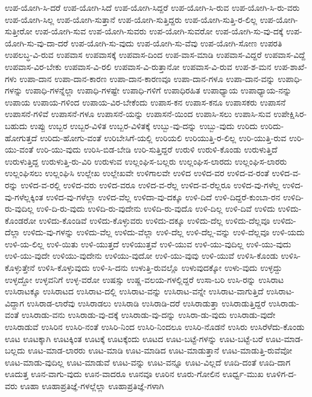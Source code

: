 {ಉಪ-ಯೋಗಿ-ಸಿ-ದರೆ
ಉಪ-ಯೋಗಿ-ಸಿದೆ
ಉಪ-ಯೋಗಿ-ಸಿದ್ದರೆ
ಉಪ-ಯೋಗಿ-ಸಿ-ರುವ
ಉಪ-ಯೋಗಿ-ಸಿ-ರು-ವರು
ಉಪ-ಯೋಗಿ-ಸಿಲ್ಲ
ಉಪ-ಯೋಗಿ-ಸುತ್ತಾನೆ
ಉಪ-ಯೋಗಿ-ಸುತ್ತಿದ್ದರು
ಉಪ-ಯೋಗಿ-ಸುತ್ತಿ-ರ-ಲಿಲ್ಲ
ಉಪ-ಯೋಗಿ-ಸುತ್ತೀರೋ
ಉಪ-ಯೋಗಿ-ಸುವ
ಉಪ-ಯೋಗಿ-ಸುವರು
ಉಪ-ಯೋಗಿ-ಸುವರೋ
ಉಪ-ಯೋಗಿ-ಸು-ವು-ದಕ್ಕೆ
ಉಪ-ಯೋಗಿ-ಸು-ವು-ದಾ-ದರೆ
ಉಪ-ಯೋಗಿ-ಸು-ವುದು
ಉಪ-ಯೋಗಿ-ಸು-ವೆವು
ಉಪ-ಯೋಗಿ-ಸೋಣ
ಉಪರತಿ
ಉಪಲಬ್ಧ-ವಿ-ರುವ
ಉಪವಾಸ
ಉಪವಾಸಕ್ಕೆ
ಉಪವಾಸ-ದಿಂದ
ಉಪ-ವಾಸ-ಮಾಡಿ
ಉಪವಾಸ-ವಿದ್ದರೆ
ಉಪವಾಸ-ವಿದ್ದೆ
ಉಪವಾಸ-ವಿರ-ಬೇಕು
ಉಪವಾಸ-ವಿ-ರಲಿ
ಉಪವಾಸ-ವಿ-ರುತ್ತಾನೋ
ಉಪವಾಸ-ವಿ-ರುವ
ಉಪ-ಶ-ಮನ
ಉಪ-ಶಾಖೆ-ಗಳು
ಉಪಾ-ದಾನ
ಉಪಾ-ದಾನ-ಕಾರಣ
ಉಪಾ-ದಾನ-ಕಾರಣವೂ
ಉಪಾ-ದಾನ-ಗಳೂ
ಉಪಾ-ದಾನ-ವನ್ನು
ಉಪಾಧಿ-ಗಳನ್ನು
ಉಪಾಧಿ-ಗಳನ್ನೆಲ್ಲಾ
ಉಪಾಧಿ-ಗಳಷ್ಟೇ
ಉಪಾಧಿ-ಗಳಿಗೆ
ಉಪಾಧಿರಹಿತ
ಉಪಾಧ್ಯಾಯ
ಉಪಾಧ್ಯಾಯ-ನನ್ನು
ಉಪಾಯ
ಉಪಾಯ-ಗಳಿಂದ
ಉಪಾಯ-ವಿರ-ಬೇಕೆಂದು
ಉಪಾಸ-ಕನ
ಉಪಾಸ-ಕನೂ
ಉಪಾಸಕರು
ಉಪಾಸನೆ
ಉಪಾಸನೆ-ಗಳಿವೆ
ಉಪಾಸನೆ-ಗಳೂ
ಉಪಾಸನೆ-ಯನ್ನು
ಉಪಾಸನೆ-ಯಿಂದ
ಉಪಾಸಿ-ಸಲು
ಉಪಾಸಿ-ಸುವ
ಉಪೇಕ್ಷಿಸಿರ-ಬಹುದು
ಉಪ್ಪು
ಉಬ್ಬರ
ಉಬ್ಬರ-ವಿಳಿತ
ಉಬ್ಬರ-ವಿಳಿತಕ್ಕೆ
ಉಬ್ಬು-ವು-ದನ್ನು
ಉಬ್ಬು-ವುದು
ಉರಿದು
ಉರಿದು-ಹೋಗುತ್ತದೆ
ಉರಿದು-ಹೋಗು-ವಂತೆ
ಉರಿಬೇಸಿಗೆ-ಯಲ್ಲಿ
ಉರಿಯಲಿ
ಉರಿಯುತ್ತಿ-ರ-ಲಿಲ್ಲ
ಉರಿ-ಯುತ್ತಿ-ರುವ
ಉರಿ-ಯು-ವಂತೆ
ಉರಿ-ಯು-ವುದು
ಉರಿಸಿ-ಬಿಡ-ಬೇಡಿ
ಉರಿ-ಸುತ್ತಿದ್ದರೆ
ಉರುಳಿ
ಉರುಳಿ-ಕೊಂಡು
ಉರುಳುತ್ತಿದೆ
ಉರುಳುತ್ತಿದ್ದ
ಉರುಳುತ್ತಿ-ರು-ವಿರಿ
ಉರುಳುವ
ಉಲ್ಲಂಘಿಸ-ಬಲ್ಲರು
ಉಲ್ಲಂಘಿಸ-ಲಾರದು
ಉಲ್ಲಂಘಿಸ-ಲಾರರು
ಉಲ್ಲಂಘಿಸಲು
ಉಲ್ಲಂಘಿಸಿ
ಉಲ್ಲೇಖ
ಉಲ್ಲೇಖವೇ
ಉಳಿಗಾಲವೇ
ಉಳಿದ
ಉಳಿದ-ವರ
ಉಳಿದ-ವ-ರಂತೆ
ಉಳಿದ-ವ-ರನ್ನು
ಉಳಿದ-ವ-ರಲ್ಲಿ
ಉಳಿದ-ವರು
ಉಳಿದ-ವರೂ
ಉಳಿದ-ವ-ರೆಲ್ಲ
ಉಳಿದ-ವ-ರೆಲ್ಲರೂ
ಉಳಿದ-ವು-ಗಳೆಲ್ಲ
ಉಳಿದ-ವು-ಗಳೆಲ್ಲಕ್ಕಿಂತ
ಉಳಿದ-ವು-ಗಳೆಲ್ಲಾ
ಉಳಿದ-ವೆಲ್ಲ
ಉಳಿದಾ-ವು-ದಕ್ಕೂ
ಉಳಿ-ದಿದೆ
ಉಳಿ-ದಿದ್ದರೆ-ಕುಂಬಾ-ರನ
ಉಳಿದಿ-ರು-ವುದಿಲ್ಲ
ಉಳಿ-ದಿ-ರು-ವುದು
ಉಳಿದಿ-ರು-ವುದೇನು
ಉಳಿದಿ-ರು-ವುದೊ
ಉಳಿ-ದಿಲ್ಲ
ಉಳಿ-ದಿವೆ
ಉಳಿದು
ಉಳಿದು-ಕೊಂಡರೋ
ಉಳಿದು-ಕೊಂಡಿವೆ
ಉಳಿದು-ಕೊಳ್ಳುವರು
ಉಳಿದು-ದಕ್ಕೂ
ಉಳಿದು-ದೆಲ್ಲ
ಉಳಿದು-ದೆಲ್ಲವೂ
ಉಳಿದು-ದೆಲ್ಲಾ
ಉಳಿದು-ವು-ಗಳನ್ನು
ಉಳಿದು-ವೆಲ್ಲ
ಉಳಿದು-ವೆಲ್ಲಾ
ಉಳಿ-ದೆಲ್ಲ
ಉಳಿ-ದೆಲ್ಲ-ವನ್ನು
ಉಳಿ-ದೆಲ್ಲವೂ
ಉಳಿ-ಯದು
ಉಳಿ-ಯ-ಲಿಲ್ಲ
ಉಳಿ-ಯಿತು
ಉಳಿ-ಯುತ್ತದೆ
ಉಳಿಯುತ್ತವೆ
ಉಳಿ-ಯುವ
ಉಳಿ-ಯು-ವುದಿಲ್ಲ
ಉಳಿ-ಯು-ವುದು
ಉಳಿ-ಯು-ವುದೇ
ಉಳಿಯು-ವುದೇನು
ಉಳಿಯು-ವುದೋ
ಉಳಿ-ಯು-ವುವು
ಉಳಿ-ಯುವೆ
ಉಳಿಸಿ-ಕೊಂಡು
ಉಳಿಸಿ-ಕೊಳ್ಳುತ್ತೇನೆ
ಉಳಿಸಿ-ಕೊಳ್ಳುವುದು
ಉಳಿ-ಸಿ-ದನು
ಉಳುತ್ತಿ-ರುವಲ್ಲೊ
ಉಳುವುದಕ್ಕೋ
ಉಳು-ವುದು
ಉಳ್ಳದ್ದು
ಉಳ್ಳದ್ದೋ
ಉಳ್ಳವನಿಗೆ
ಉಳ್ಳ-ವರೋ
ಉಷಸ್ಸು
ಉಷ್ಣ-ವಲಯ-ಗಳಲ್ಲಿದ್ದರೆ
ಉಸಾ-ಬರಿ
ಉಸಿ-ರನ್ನು
ಉಸಿರಾಟ
ಉಸಿರಾಟಕ್ಕೂ
ಉಸಿರಾಟದ
ಉಸಿರಾಟ-ದಲ್ಲಿ
ಉಸಿರಾಟ-ವನ್ನು
ಉಸಿರಾಟ-ವನ್ನೇ
ಉಸಿರಾಟ-ವಾಗುತ್ತಿದೆ
ಉಸಿರಾಟ-ವಿದ್ದಾಗ
ಉಸಿರಾಡ-ಲಾರೆವು
ಉಸಿರಾಡಲು
ಉಸಿರಾಡಿ
ಉಸಿರಾಡಿ-ದರೆ
ಉಸಿರಾಡುತ್ತಾ
ಉಸಿರಾಡುತ್ತಿದ್ದರೆ
ಉಸಿರಾಡು-ವಂತೆ
ಉಸಿರಾಡು-ವನು
ಉಸಿರಾಡು-ವು-ದಕ್ಕೆ
ಉಸಿರಾಡು-ವು-ದನ್ನು
ಉಸಿರಾ-ಡು-ವುದು
ಉಸಿರಾಡು-ವುದೇ
ಉಸಿರಾಡುವೆ
ಉಸಿರಿನ
ಉಸಿರಿ-ನಂತೆ
ಉಸಿರಿ-ನಿಂದ
ಉಸಿರಿ-ನಿಂದಲೂ
ಉಸಿರಿ-ನೊಡನೆ
ಉಸಿರು
ಉಸಿರೆಳೆದು-ಕೊಂಡು
ಊಟ
ಊಟಕ್ಕಾಗಿ
ಊಟಕ್ಕಿಂತ
ಊಟಕ್ಕೆ
ಊಟಕ್ಕೆಂದು
ಊಟದ
ಊಟ-ಬಟ್ಟೆ-ಗಳನ್ನು
ಊಟ-ಬಟ್ಟೆ-ಬರೆ
ಊಟ-ಮಾಡ-ಬಲ್ಲದು
ಊಟ-ಮಾಡ-ಲಾರರು
ಊಟ-ಮಾಡಿ
ಊಟ-ಮಾಡಿದ
ಊಟ-ಮಾಡುತ್ತಾನೆ
ಊಟ-ಮಾಡುತ್ತಿ-ರುವೆವೋ
ಊಟ-ಮಾಡು-ವುದಿಲ್ಲ
ಊಟ-ಮಾಡುವೆ
ಊಟ-ವನ್ನು
ಊಟ-ವನ್ನೂ
ಊಟ-ವಿಲ್ಲದೆ
ಊದಿ-ದಂತೆ
ಊದಿ-ದಾಗ
ಊದುತ್ತ
ಊನ-ವಾಗು-ವುದು
ಊನ-ವಾದರೂ
ಊನವೂ
ಊರಿನ
ಊರು-ಗೋಲಿನ
ಊರ್ಧ್ವ-ಮುಖ
ಊಳಿಗ-ದ-ವರು
ಊಹಾ
ಊಹಾಪ್ರತಿಜ್ಞೆ-ಗಳಲ್ಲೆಲ್ಲಾ
ಊಹಾಪ್ರತಿಜ್ಞೆ-ಗಳಾಗಿ
}
